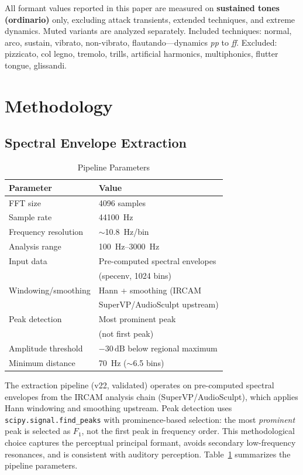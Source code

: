 \documentclass[journal]{IEEEtran}
\newcommand{\Fn}[1]{F_{#1}}
\newcommand{\dB}{\,\text{dB}}
\begin{document}
All formant values reported in this paper are measured on \textbf{sustained tones (ordinario)} only, excluding attack transients, extended techniques, and extreme dynamics. Muted variants are analyzed separately. Included techniques: normal, arco, sustain, vibrato, non-vibrato, flautando---dynamics \textit{pp} to \textit{ff}. Excluded: pizzicato, col legno, tremolo, trills, artificial harmonics, multiphonics, flutter tongue, glissandi.

\section{Methodology}
\label{sec:method}

\subsection{Spectral Envelope Extraction}

\begin{table}[!t]
\centering
\caption{Pipeline Parameters}
\label{tab:pipeline}
\begin{tabular}{@{}ll@{}}
\toprule
Parameter & Value \\
\midrule
FFT size & \num{4096} samples \\
Sample rate & \SI{44100}{\hertz} \\
Frequency resolution & $\sim$\SI{10.8}{\hertz}/bin \\
Analysis range & \SIrange{100}{3000}{\hertz} \\
Input data & Pre-computed spectral envelopes \\
 & (specenv, \num{1024} bins) \\
Windowing/smoothing & Hann + smoothing (IRCAM \\
 & SuperVP/AudioSculpt upstream) \\
Peak detection & Most prominent peak \\
 & (not first peak) \\
Amplitude threshold & $-30\dB$ below regional maximum \\
Minimum distance & \SI{70}{\hertz} ($\sim$6.5 bins) \\
\bottomrule
\end{tabular}
\end{table}

The extraction pipeline (v22, validated) operates on pre-computed spectral envelopes from the IRCAM analysis chain (SuperVP/AudioSculpt), which applies Hann windowing and smoothing upstream. Peak detection uses \texttt{scipy.signal.find\_peaks} with prominence-based selection: the most \emph{prominent} peak is selected as $\Fn{1}$, not the first peak in frequency order. This methodological choice captures the perceptual principal formant, avoids secondary low-frequency resonances, and is consistent with auditory perception. Table~\ref{tab:pipeline} summarizes the pipeline parameters.
\end{document}
